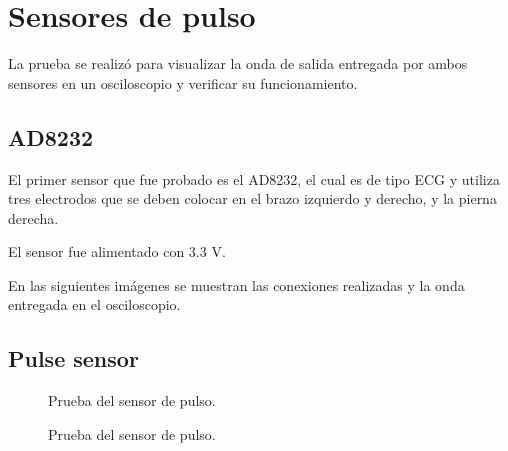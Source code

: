 
\section{Sensores de pulso}
La prueba se realizó para visualizar la onda de salida entregada por ambos sensores en un osciloscopio y verificar su funcionamiento. 

\subsection{AD8232}

El primer sensor que fue probado es el AD8232, el cual es de tipo ECG y utiliza tres electrodos que se deben colocar en el brazo izquierdo y derecho, y la pierna derecha. 

El sensor fue alimentado con 3.3 V.

En las siguientes imágenes se muestran las conexiones realizadas y la onda entregada en el osciloscopio.
	
\subsection{Pulse sensor}	

	\begin{figure}[htbp!]
		\centering
		\caption{Prueba del sensor de pulso.}
		\label{fig:PulseSensor2}
	\end{figure}
	
	\begin{figure}[htbp!]
		\centering
		\caption{Prueba del sensor de pulso.}
		\label{fig:PulseSensor1}
	\end{figure}
	
